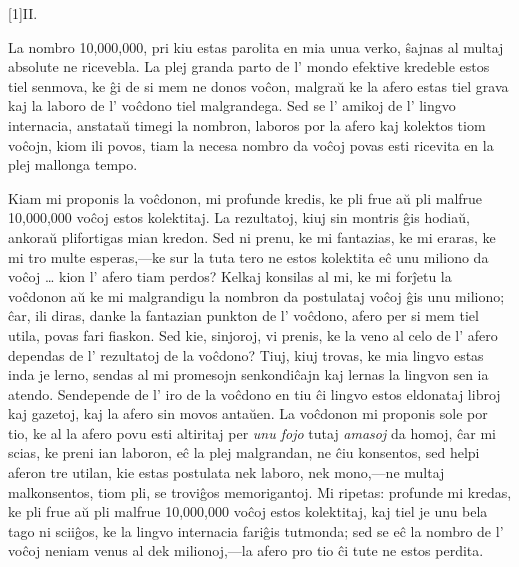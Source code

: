 \documentclass[ngerman,12pt,twoside]{book}
\begin{document}
\begin{center}
\scalebox{2}[1]{\large\cowboyfont II.}
\end{center}

La nombro 10,000,000, pri kiu estas parolita en mia unua verko, ŝajnas al multaj absolute ne ricevebla. La plej granda parto de l' mondo efektive kredeble estos tiel senmova, ke ĝi de si mem ne donos voĉon, malgraŭ ke la afero estas tiel grava kaj la laboro de l' voĉdono tiel malgrandega. Sed se l' amikoj de l' lingvo internacia, anstataŭ timegi la nombron, laboros por la afero kaj kolektos tiom voĉojn, kiom ili povos, tiam la necesa nombro da voĉoj povas esti ricevita en la plej mallonga tempo.

Kiam mi proponis la voĉdonon, mi profunde kredis, ke pli frue aŭ pli malfrue 10,000,000 voĉoj estos kolektitaj. La rezultatoj, kiuj sin montris ĝis hodiaŭ, ankoraŭ plifortigas mian kredon. Sed ni prenu, ke mi fantazias, ke mi eraras, ke mi tro multe esperas,---ke sur la tuta tero ne estos kolektita eĉ unu miliono da voĉoj \ldots{} kion l' afero tiam perdos? Kelkaj konsilas al mi, ke mi forĵetu la voĉdonon aŭ ke mi malgrandigu la nombron da postulataj voĉoj ĝis unu miliono; \glqq{}ĉar\grqq{}, ili diras, \glqq{}danke la fantazian punkton de l' voĉdono, afero per si mem tiel utila, povas fari fiaskon.\grqq{} Sed kie, sinjoroj, vi prenis, ke la veno al celo de l' afero dependas de l' rezultatoj de la voĉdono? Tiuj, kiuj trovas, ke mia lingvo estas inda je lerno, sendas al mi promesojn senkondiĉajn kaj lernas la lingvon sen ia atendo. Sendepende de l' iro de la voĉdono en tiu ĉi lingvo estos eldonataj libroj kaj gazetoj, kaj la afero sin movos antaŭen. La voĉdonon mi proponis sole por tio, ke al la afero povu esti altiritaj per \emph{unu fojo} tutaj \emph{amasoj} da homoj, ĉar mi scias, ke preni ian laboron, eĉ la plej malgrandan, ne ĉiu konsentos, sed helpi aferon tre utilan, kie estas postulata nek laboro, nek mono,---ne multaj malkonsentos, tiom pli, se troviĝos memorigantoj. Mi ripetas: profunde mi kredas, ke pli frue aŭ pli malfrue 10,000,000 voĉoj estos kolektitaj, kaj tiel je unu bela tago ni sciiĝos, ke la lingvo internacia fariĝis tutmonda; sed se eĉ la nombro de l' voĉoj neniam venus al dek milionoj,---la afero pro tio ĉi tute ne estos perdita.
\end{document}
